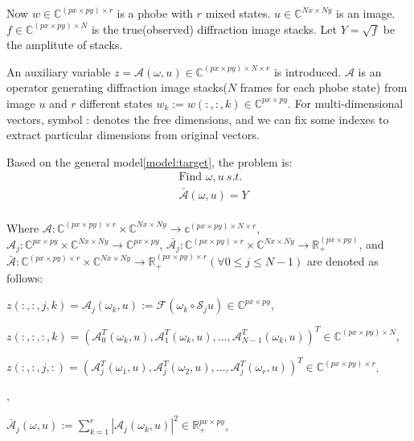 \documentclass{article}
\numberwithin{equation}{section}
\begin{document}
Now $w \in \mathbb{C}^{(px\times py) \times r}$ is a phobe with $r$ mixed states. $u \in \mathbb{C}^{Nx\times Ny}$ is an image.  $f \in \mathbb{C}^{(px \times py) \times N}$ is the true(observed) diffraction image stacks. Let $Y=\sqrt{f}$ be the amplitute of stacks.

An auxiliary variable $z=\mathcal{A}(\omega, u) \in \mathbb{C}^{(px \times py) \times N \times r}$ is introduced. $\mathcal{A}$ is an operator generating diffraction image stacks($N$ frames for each phobe state) from image $u$ and $r$ different states $w_k:=w(:,:,k) \in \mathbb{C}^{px \times py}$. For multi-dimensional vectors, symbol : denotes the free dimensions, and we can fix some indexes to extract particular dimensions from original vectors.  

Based on the general model\ref{model:target}, the problem is:
$$
\begin{aligned}
&\mbox{Find } \omega,u \ s.t.\\
& \bar{\mathcal{A}}(\omega, u)=Y\\
\end{aligned}
$$


Where $\mathcal{A}: \mathbb{C}^{(px\times py)\times r} \times \mathbb{C}^{Nx \times Ny} \rightarrow \mathbb{c}^{(px \times py) \times N \times r}$,$\mathcal{A}_{j}: \mathbb{C}^{px\times py} \times \mathbb{C}^{Nx \times Ny} \rightarrow \mathbb{C}^{px\times py} $,
$\bar{\mathcal{A}_j}:\mathbb{C}^{(px\times py)\times r} \times \mathbb{C}^{Nx \times Ny} \rightarrow \mathbb{R}_+^{(px \times py)}$, and $\bar{\mathcal{A}}:\mathbb{C}^{(px\times py)\times r} \times \mathbb{C}^{Nx \times Ny} \rightarrow \mathbb{R}_+^{(px \times py) \times r} (\forall 0 \leq j \leq N-1)$ are
denoted as follows:

$z(:,:,j,k) = \mathcal{A}_{j}(\omega_k, u):=\mathcal{F}\left(\omega_k \circ \mathcal{S}_{j} u\right) \in \mathbb{C}^{px\times py}$,

$z(:,:,:,k) =\left(\mathcal{A}_{0}^{T}(\omega_k, u), \mathcal{A}_{1}^{T}(\omega_k, u), \ldots, \mathcal{A}_{N-1}^{T}(\omega_k, u)\right)^{T} 
\in \mathbb{C}^{(px\times py) \times N}$,

$z(:,:,j,:) =\left(\mathcal{A}_{j}^{T}(\omega_1, u), \mathcal{A}_{j}^{T}(\omega_2, u), \ldots, \mathcal{A}_{j}^{T}(\omega_r, u)\right)^{T} 
\in \mathbb{C}^{(px\times py) \times r}$.


,

$\bar{\mathcal{A}}_{j}(\omega, u):= \sum_{k=1}^r |\mathcal{A}_{j}(\omega_k, u)|^2 \in \mathbb{R}_+^{px\times py}$,
\end{document}
